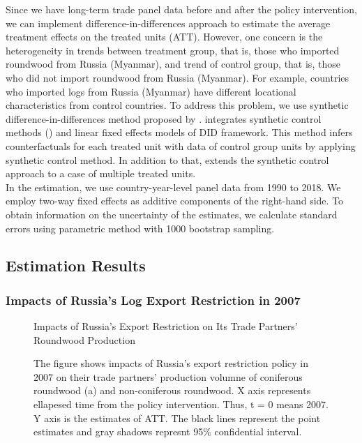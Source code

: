 \documentclass[a4paper,12pt]{article}
\begin{document}
Since we have long-term trade panel data before and after the policy intervention, we can implement difference-in-differences approach to estimate the average treatment effects on the treated units (ATT). However, one concern is the heterogeneity in trends between treatment group, that is, those who imported roundwood from Russia (Myanmar), and trend of control group, that is, those who did not import roundwood from Russia (Myanmar). For example, countries who imported logs from Russia (Myanmar) have different locational characteristics from control countries. To address this problem, we use synthetic difference-in-differences method proposed by \cite{xu2017generalized}. \cite{xu2017generalized} integrates synthetic control methods (\cite{abadie2010synthetic}) and linear fixed effects models of DID framework. This method infers counterfactuals for each treated unit with data of control group units by applying synthetic control method. In addition to that, \cite{xu2017generalized} extends the synthetic control approach to a case of multiple treated units.\\ 

In the estimation, we use country-year-level panel data from 1990 to 2018. We employ two-way fixed effects as additive components of the right-hand side. To obtain information on the uncertainty of the estimates, we calculate standard errors using parametric method with 1000 bootstrap sampling.

\subsection{Estimation Results}
\subsubsection*{Impacts of Russia's Log Export Restriction in 2007}

\begin{figure}[H] 
    \centering
    \caption{Impacts of Russia's Export Restriction on Its Trade Partners' Roundwood Production}
    \caption*{\small{The figure shows impacts of Russia's export restriction policy in 2007 on their trade partners' production volumne of coniferous roundwood (a) and non-coniferous roundwood. X axis represents ellapesed time from the policy intervention. Thus, t = 0 means 2007. Y axis is the estimates of ATT. The black lines represent the point estimates and gray shadows represnt 95\% confidential interval.}}
    \label{fig:att_prod_Russia}
\end{figure}
\end{document}
